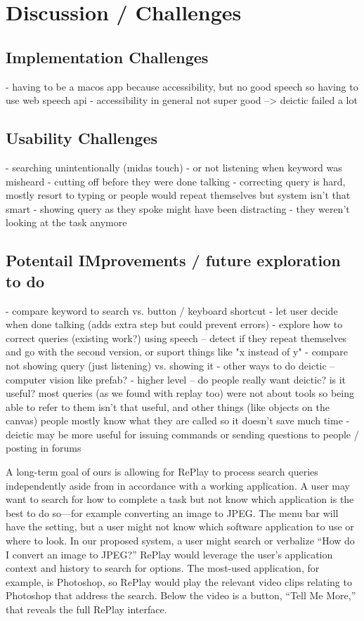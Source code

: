 \section{Discussion / Challenges}
\subsection{Implementation Challenges}
- having to be a macos app because accessibility, but no good speech so having to use web speech api
- accessibility in general not super good --> deictic failed a lot
\subsection{Usability Challenges}
- searching unintentionally (midas touch)
- or not listening when keyword was misheard
- cutting off before they were done talking
- correcting query is hard, mostly resort to typing or people would repeat themselves but system isn't that smart
- showing query as they spoke might have been distracting - they weren't looking at the task anymore
\subsection{Potentail IMprovements / future exploration to do}
- compare keyword to search vs. button / keyboard shortcut
- let user decide when done talking (adds extra step but could prevent errors)
- explore how to correct queries (existing work?) using speech -- detect if they repeat themselves and go with the second version, or suport things like "x instead of y"
- compare not showing query (just listening) vs. showing it
- other ways to do deictic -- computer vision like prefab?
- higher level -- do people really want deictic? is it useful? most queries (as we found with replay too) were not about tools so being able to refer to them isn't that useful, and other things (like objects on the canvas) people mostly know what they are called so it doesn't save much time
- deictic may be more useful for issuing commands or sending questions to people / posting in forums




A long-term goal of ours is allowing for RePlay to process search queries independently aside from in accordance with a working application. A user may want to search for how to complete a task but not know which application is the best to do so—for example converting an image to JPEG. The menu bar will have the setting, but a user might not know which software application to use or where to look. In our proposed system, a user might search or verbalize “How do I convert an image to JPEG?” RePlay would leverage the user’s application context and history to search for options. The most-used application, for example, is Photoshop, so RePlay would play the relevant video clips relating to Photoshop that address the search. Below the video is a button, “Tell Me More,” that reveals the full RePlay interface. 




